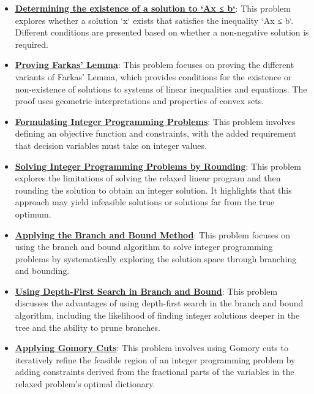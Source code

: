 \documentclass{article}%
\begin{document}
\begin{itemize}[leftmargin=*]
\item \href{https://www.math.purdue.edu/~yipn/421/2024-10-28-Farkas.pdf#page=4}{\textbf{Determining the existence of a solution to `Ax ≤ b`}}: This problem explores whether a solution `x` exists that satisfies the inequality `Ax ≤ b`. Different conditions are presented based on whether a non-negative solution is required.%
\item \href{https://www.math.purdue.edu/~yipn/421/2024-10-28-Farkas.pdf#page=1}{\textbf{Proving Farkas' Lemma}}: This problem focuses on proving the different variants of Farkas' Lemma, which provides conditions for the existence or non-existence of solutions to systems of linear inequalities and equations. The proof uses geometric interpretations and properties of convex sets.%
\item \href{https://www.math.purdue.edu/~yipn/421/2024-10-31-IntLinProg.pdf#page=1}{\textbf{Formulating Integer Programming Problems}}: This problem involves defining an objective function and constraints, with the added requirement that decision variables must take on integer values.%
\item \href{https://www.math.purdue.edu/~yipn/421/2024-10-31-IntLinProg.pdf#page=2}{\textbf{Solving Integer Programming Problems by Rounding}}: This problem explores the limitations of solving the relaxed linear program and then rounding the solution to obtain an integer solution. It highlights that this approach may yield infeasible solutions or solutions far from the true optimum.%
\item \href{https://www.math.purdue.edu/~yipn/421/2024-10-31-IntLinProg.pdf#page=5}{\textbf{Applying the Branch and Bound Method}}: This problem focuses on using the branch and bound algorithm to solve integer programming problems by systematically exploring the solution space through branching and bounding.%
\item \href{https://www.math.purdue.edu/~yipn/421/2024-10-31-IntLinProg.pdf#page=11}{\textbf{Using Depth{-}First Search in Branch and Bound}}: This problem discusses the advantages of using depth-first search in the branch and bound algorithm, including the likelihood of finding integer solutions deeper in the tree and the ability to prune branches.%
\item \href{https://www.math.purdue.edu/~yipn/421/2024-10-31-IntLinProg.pdf#page=15}{\textbf{Applying Gomory Cuts}}: This problem involves using Gomory cuts to iteratively refine the feasible region of an integer programming problem by adding constraints derived from the fractional parts of the variables in the relaxed problem's optimal dictionary.%

\end{itemize}
\end{document}
